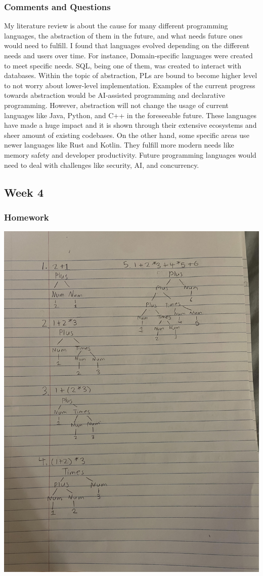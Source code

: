 \documentclass{article}
\theoremstyle{theorem}
\theoremstyle{definition}
\theoremstyle{remark}
\begin{document}
\subsubsection*{Comments and Questions}
My literature review is about the cause for many different programming languages, the abstraction of them in the future, and what needs future ones would need to fulfill. 
I found that languages evolved depending on the different needs and users over time. For instance, Domain-specific languages were created to meet specific needs. SQL, being one of them, was created to interact with databases.
Within the topic of abstraction, PLs are bound to become higher level to not worry about lower-level implementation. Examples of the current progress towards abstraction would be AI-assisted programming and declarative programming. 
However, abstraction will not change the usage of current languages like Java, Python, and C++ in the foreseeable future. These languages have made a huge impact and it is shown through their extensive ecosystems and sheer amount of existing codebases. On the other hand, some specific areas use newer languages like Rust and Kotlin. They fulfill more modern needs like memory safety and developer productivity.
Future programming languages would need to deal with challenges like security, AI, and concurrency.

\subsection{Week 4}
\subsubsection*{Homework}
\includegraphics[scale=0.1]{parsing.jpg}
\end{document}
